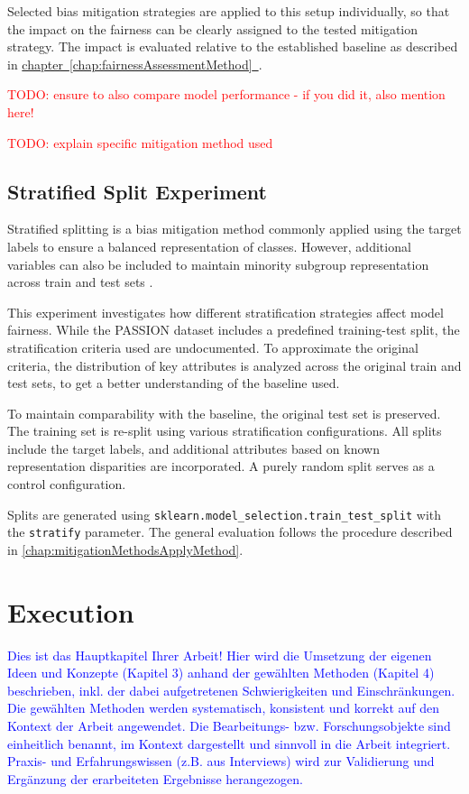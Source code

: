 \documentclass[12pt, a4paper, oneside]{book}   	%
\renewcommand{\todo}[1]{\textcolor{red}{TODO: #1}}
\newcommand{\linkchap}[1]{\hyperref[#1]{chapter~\ref{#1}~\nameref{#1}}}
\newcommand{\baaCriteria}[1]{\textcolor{blue}{#1}}
\begin{document}
		Selected bias mitigation strategies are applied to this setup individually, so that the impact on the fairness can be clearly assigned to the tested mitigation strategy. The impact is evaluated relative to the established baseline as described in \linkchap{chap:fairnessAssessmentMethod}.
		
		\todo{ensure to also compare model performance - if you did it, also mention here!}
		
		\todo{explain specific mitigation method used}
		
		\section{Stratified Split Experiment}
		Stratified splitting is a bias mitigation method commonly applied using the target labels to ensure a balanced representation of classes. However, additional variables can also be included to maintain minority subgroup representation across train and test sets \autocite{Balde_2023}.
		
		This experiment investigates how different stratification strategies affect model fairness. While the PASSION dataset includes a predefined training-test split, the stratification criteria used are undocumented. To approximate the original criteria, the distribution of key attributes is analyzed across the original train and test sets, to get a better understanding of the baseline used.
		
		To maintain comparability with the baseline, the original test set is preserved. The training set is re-split using various stratification configurations. All splits include the target labels, and additional attributes based on known representation disparities are incorporated. A purely random split serves as a control configuration.
		
		Splits are generated using \texttt{sklearn.model\_selection.train\_test\_split} with the \texttt{stratify} parameter. The general evaluation follows the procedure described in \autoref{chap:mitigationMethodsApplyMethod}.
		
	\chapter{Execution}
		\baaCriteria{Dies ist das Hauptkapitel Ihrer Arbeit! Hier wird die Umsetzung der eigenen Ideen und Konzepte (Kapitel 3) anhand der gewählten Methoden (Kapitel 4) beschrieben, inkl. der dabei aufgetretenen Schwierigkeiten und Einschränkungen.}
		\baaCriteria{Die gewählten Methoden werden systematisch, konsistent und korrekt auf den Kontext der Arbeit angewendet. Die Bearbeitungs- bzw. Forschungsobjekte sind einheitlich benannt, im Kontext dargestellt und sinnvoll in die Arbeit integriert. Praxis- und Erfahrungswissen (z.B. aus Interviews) wird zur Validierung und Ergänzung der erarbeiteten Ergebnisse herangezogen. }
		
\end{document}
